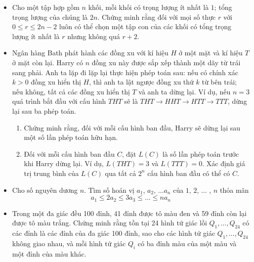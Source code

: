 \documentclass[11pt]{scrartcl}
\begin{document}
\begin{itemize}[label=, leftmargin=0em, itemsep=0.5em]
    \item \begin{btvn}
        Cho một tập hợp gồm $n$ khối, mỗi khối có trọng lượng ít nhất là $1$; tổng trọng lượng của chúng là $2n$. Chứng minh rằng đối với mọi số thực $r$ với $0 \leq r \leq 2n-2$ luôn có thể chọn một tập con của các khối có tổng trọng lượng ít nhất là $r$ nhưng không quá $r + 2$.
    \end{btvn}

    \item \begin{btvn}
        Ngân hàng Bath phát hành các đồng xu với kí hiệu $H$ ở một mặt và kí hiệu $T$ ở mặt còn lại. Harry có $n$ đồng xu này được sắp xếp thành một dãy từ trái sang phải. Anh ta lặp đi lặp lại thực hiện phép toán sau: nếu có chính xác $k>0$ đồng xu hiển thị $H$, thì anh ta lật ngược đồng xu thứ $k$ từ bên trái; nếu không, tất cả các đồng xu hiển thị $T$ và anh ta dừng lại. Ví dụ, nếu $n=3$ quá trình bắt đầu với cấu hình $THT$ sẽ là $THT \to HHT \to HTT \to TTT$, dừng lại sau ba phép toán.
        \begin{enumerate}[label=(\alph*)]
            \item Chứng minh rằng, đối với mỗi cấu hình ban đầu, Harry sẽ dừng lại sau một số lần phép toán hữu hạn.
            \item Đối với mỗi cấu hình ban đầu $C$, đặt $L(C)$ là số lần phép toán trước khi Harry dừng lại. Ví dụ, $L(THT) = 3$ và $L(TTT) = 0$. Xác định giá trị trung bình của $L(C)$ qua tất cả $2^n$ cấu hình ban đầu có thể có $C$.
        \end{enumerate}
    \end{btvn}



    \item \begin{btvn}
        Cho số nguyên dương $n$. Tìm số hoán vị $a_1$, $a_2$, $\dots a_n$ của $1$, $2$, $\dots$ , $n$ thỏa mãn
        $$a_1 \le 2a_2\le 3a_3 \le \dots \le na_n$$
    \end{btvn}

    \item \begin{btvn}
        Trong một đa giác đều 100 đỉnh, 41 đỉnh được tô màu đen và 59 đỉnh còn lại được tô màu trắng. Chứng minh rằng tồn tại 24 hình tứ giác lồi $Q_{1}, \ldots, Q_{24}$ có các đỉnh là các đỉnh của đa giác 100 đỉnh, sao cho các hình tứ giác $Q_{1}, \ldots, Q_{24}$ không giao nhau, và mỗi hình tứ giác $Q_{i}$ có ba đỉnh màu của một màu và một đỉnh của màu khác.
    \end{btvn}


\end{itemize}
\end{document}
